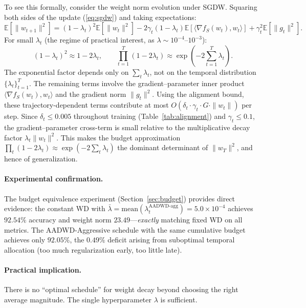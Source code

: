 \documentclass{article}
\begin{document}
To see this formally, consider the weight norm evolution under SGDW.
Squaring both sides of the update (\ref{eq:sgdw}) and taking expectations:
\begin{equation}
  \mathbb{E}[\|w_{t+1}\|^2]
  = (1 - \lambda_t)^2 \mathbb{E}[\|w_t\|^2]
    - 2\gamma_t(1-\lambda_t)\mathbb{E}[\langle \nabla f_S(w_t), w_t \rangle]
    + \gamma_t^2 \mathbb{E}[\|g_t\|^2].
\end{equation}
For small $\lambda_t$ (the regime of practical interest, as
$\lambda \sim 10^{-4}$--$10^{-3}$):
\begin{equation}
  (1 - \lambda_t)^2 \approx 1 - 2\lambda_t, \qquad
  \prod_{t=1}^T (1 - 2\lambda_t) \approx \exp\!\left(-2\sum_{t=1}^T \lambda_t\right).
\end{equation}
The exponential factor depends only on $\sum_t \lambda_t$, not on the temporal
distribution $\{\lambda_t\}_{t=1}^T$.
The remaining terms involve the gradient--parameter inner product
$\langle \nabla f_S(w_t), w_t \rangle$ and the gradient norm $\|g_t\|^2$.
Using the alignment bound, these trajectory-dependent terms contribute at most
$O(\delta_t \cdot \gamma_t \cdot G \cdot \|w_t\|)$ per step.
Since $\delta_t \leq 0.005$ throughout training (Table~\ref{tab:alignment}) and
$\gamma_t \leq 0.1$, the gradient--parameter cross-term is small relative to the
multiplicative decay factor $\lambda_t \|w_t\|^2$.
This makes the budget approximation
$\prod_t(1 - 2\lambda_t) \approx \exp(-2\sum_t \lambda_t)$
the dominant determinant of $\|w_T\|^2$, and hence of generalization.

\paragraph{Experimental confirmation.}
The budget equivalence experiment (Section~\ref{sec:budget}) provides direct
evidence: the constant WD with
$\bar{\lambda} = \text{mean}(\lambda_t^{\text{AADWD-agg}}) = 5.0 \times 10^{-4}$
achieves $92.54\%$ accuracy and weight norm $23.49$---\emph{exactly} matching fixed
WD on all metrics.
The AADWD-Aggressive schedule with the same cumulative budget achieves only $92.05\%$,
the $0.49\%$ deficit arising from suboptimal temporal allocation (too much
regularization early, too little late).

\paragraph{Practical implication.}
There is no ``optimal schedule'' for weight decay beyond choosing the right average
magnitude.
The single hyperparameter $\lambda$ is sufficient.
\end{document}
